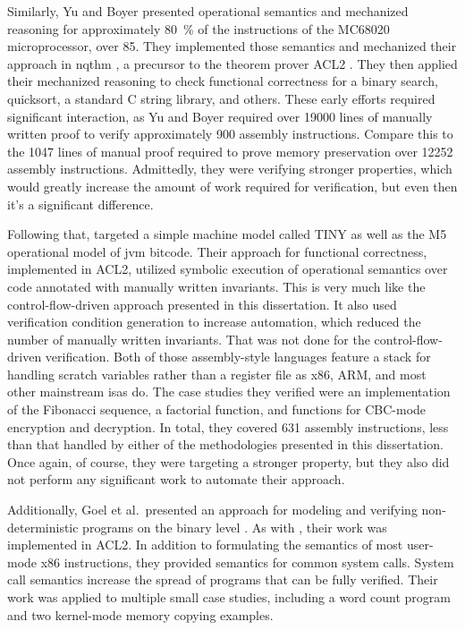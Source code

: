 Similarly, Yu and Boyer \autocite{yu1993automated,boyer1996automated}
presented operational semantics and mechanized reasoning
for approximately \SI{80}{\percent} of the instructions of the MC68020 microprocessor,
over 85.
They implemented those semantics and mechanized their approach
in \ac{nqthm} \autocite{boyer1979computational},
a precursor to the theorem prover ACL2 \autocite{ACL2}.
They then applied their mechanized reasoning to check functional correctness
for a binary search, quicksort, a standard C string library, and others.
These early efforts required significant interaction,
as Yu and Boyer required over \num{19000}
lines of manually written proof to verify approximately \num{900} assembly instructions.
Compare this to the \num{1047} lines of manual proof
required to prove memory preservation over \num{12252} assembly instructions.
Admittedly, they were verifying stronger properties,
which would greatly increase the amount of work required for verification,
but even then it's a significant difference.

Following that, \textcite{matthews2006verification}
targeted a simple machine model called TINY
as well as the M5 operational model of \ac{jvm} bitcode.
Their approach for functional correctness, implemented in ACL2,
utilized symbolic execution of operational semantics
over code annotated with manually written invariants.
This is very much like the control-flow-driven approach presented in this dissertation.
It also used verification condition generation to increase automation,
which reduced the number of manually written invariants.
That was not done for the control-flow-driven verification.
Both of those assembly-style languages feature a stack
for handling scratch variables rather than a register file
as x86, ARM, and most other mainstream \acp{isa} do.
The case studies they verified were an implementation of the Fibonacci sequence,
a factorial function, and functions for CBC-mode encryption and decryption.
In total, they covered \num{631} assembly instructions,
less than that handled by either of the methodologies presented in this dissertation.
Once again, of course, they were targeting a stronger property,
but they also did not perform any significant work to automate their approach.

Additionally, Goel et al.\ presented an approach for modeling and verifying
non-deterministic programs on the binary level \autocite{goel2014syscalls,goelphd}.
As with \textcite{matthews2006verification}, their work was implemented in ACL2.
In addition to formulating the semantics of most user-mode x86 instructions,
they provided semantics for common system calls.
System call semantics increase the spread of programs that can be fully verified.
Their work was applied to multiple small case studies,
including a word count program and two kernel-mode memory copying examples.
 
